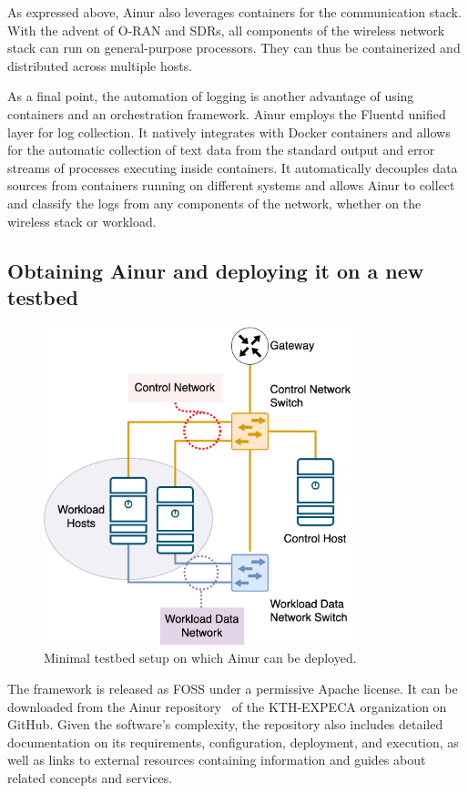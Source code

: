 As expressed above, Ainur also leverages containers for the communication stack.
With the advent of \gls{O-RAN} and \glspl{SDR}, all components of the wireless network stack can run on general-purpose processors.
They can thus be containerized and distributed across multiple hosts.

As a final point, the automation of logging is another advantage of using containers and an orchestration framework.
Ainur employs the Fluentd unified layer for log collection.
It natively integrates with Docker containers and allows for the automatic collection of text data from the standard output and error streams of processes executing inside containers.
It automatically decouples data sources from containers running on different systems and allows Ainur to collect and classify the logs from any components of the network, whether on the wireless stack or workload.

\subsection{Obtaining Ainur and deploying it on a new testbed}

\begin{figure}
    \centering
    \includegraphics[height=25em]{publications/2022Ainur/figures/network-minimal}
    \caption{Minimal testbed setup on which Ainur can be deployed.}\label{paper:olguinmunoz2022ainur:fig:network:minimal}
\end{figure}

The framework is released as \gls{FOSS} under a permissive Apache license.
It can be downloaded from the Ainur repository~\cite{ainur:github} of the {KTH-EXPECA} organization on GitHub.
Given the software's complexity, the repository also includes detailed documentation on its requirements, configuration, deployment, and execution, as well as links to external resources containing information and guides about related concepts and services.

